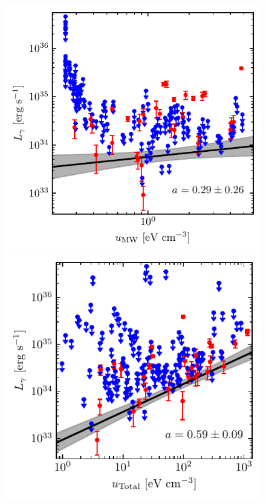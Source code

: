 \documentclass[doublespace,nopageskip]{VTthesis} %
\begin{document}
\begin{figure}
    \centering
    \includegraphics[width=\columnwidth]{Figures/Globular/correlation/L_gamma_vs_isrf_urad.pdf}
    \includegraphics[width=\columnwidth]{Figures/Globular/correlation/L_gamma_vs_total_urad.pdf}

\end{figure}
\end{document}
